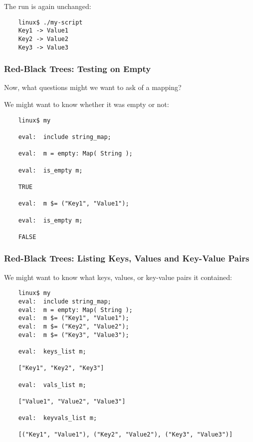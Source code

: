The run is again unchanged:

\begin{verbatim}
    linux$ ./my-script
    Key1 -> Value1
    Key2 -> Value2
    Key3 -> Value3
\end{verbatim}


\cutend*

\subsubsection{Red-Black Trees: Testing on Empty}

Now, what questions might we want to ask of a mapping?

We might want to know whether it was empty or not:

\begin{verbatim}
    linux$ my

    eval:  include string_map;

    eval:  m = empty: Map( String );

    eval:  is_empty m;

    TRUE

    eval:  m $= ("Key1", "Value1");

    eval:  is_empty m;

    FALSE
\end{verbatim}


\cutend*

\subsubsection{Red-Black Trees:  Listing Keys, Values and Key-Value Pairs}

We might want to know what keys, values, or key-value pairs it contained: 

\begin{verbatim}
    linux$ my
    eval:  include string_map;
    eval:  m = empty: Map( String );
    eval:  m $= ("Key1", "Value1");
    eval:  m $= ("Key2", "Value2");
    eval:  m $= ("Key3", "Value3");

    eval:  keys_list m;

    ["Key1", "Key2", "Key3"]

    eval:  vals_list m;

    ["Value1", "Value2", "Value3"]

    eval:  keyvals_list m;

    [("Key1", "Value1"), ("Key2", "Value2"), ("Key3", "Value3")]
\end{verbatim}

